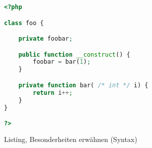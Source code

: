 \begin{lstlisting}[language=php]
<?php

class foo {

    private foobar;

    public function __construct() {
        foobar = bar(1);
    } 

    private function bar( /* int */ i) {
        return i++;
    }
}

?>
\end{lstlisting}

Listing, Besonderheiten erwähnen (Syntax)

